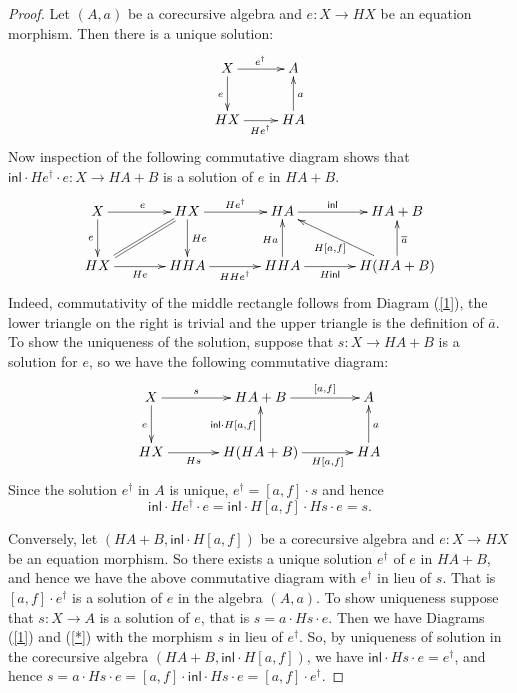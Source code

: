 \documentclass{LMCS}
\theoremstyle{plain}
\theoremstyle{definition}
\numberwithin{equation}{section}
\begin{document}
\begin{proof}
Let $(A, a)$ be a corecursive algebra and $e:X\rightarrow HX$ be an equation morphism. Then there is a unique solution:
\begin{equation}\label{1}
\vcenter{\xymatrix{
X\ar[r]^{e^\dagger}\ar[d]_{e}&A\\
HX\ar[r]_{He^\dagger}&HA\ar[u]_a
}}
\end{equation}
Now inspection of the following commutative diagram shows that $\mathsf{inl}\cdot He^\dagger\cdot e:X\rightarrow HA+B$ is a solution of $e$ in $HA+B$.
\begin{equation}\label{*}
\vcenter{\xymatrix@C+1pc{
X\ar[r]^e\ar[d]_-{e}&HX\ar[r]^-{He^\dagger}\ar[d]^-{He}&HA\ar[r]^-{\mathsf{inl}}&HA+B\\
HX\ar@{=}[ur]\ar[r]_-{He}&HHA\ar[r]_-{HHe^\dagger}&HHA\ar[u]^{Ha}\ar[r]_-{H\mathsf{inl}}&H(HA+B)\ar[lu]^{H[a,f]}\ar[u]_{\overline a}
}}
\end{equation}
Indeed, commutativity of the middle rectangle follows from Diagram (\ref{1}), the lower triangle on the right is trivial and the upper triangle is the definition of $\overline a$.
To show the uniqueness of the solution, suppose that $s:X\rightarrow HA+B$ is a solution for $e$, so we have the following commutative diagram:
$$
\xymatrix@C+1pc{
X\ar[r]^-{s}\ar[d]_e&HA+B\ar[r]^-{[a,f]}&A\\
HX\ar[r]_-{Hs}&H(HA+B)\ar[u]^{\mathsf{inl}\cdot H[a,f]}\ar[r]_-{H[a,f]}&HA\ar[u]_{a}
}
$$
Since the solution $e^\dagger$ in $A$ is unique, $e^\dagger=[a,f]\cdot s$ and hence
$$\mathsf{inl}\cdot He^\dagger \cdot e = \mathsf{inl}\cdot H[a,f]\cdot Hs\cdot e = s.$$

Conversely, let $(HA+B, \mathsf{inl}\cdot H[a,f])$ be a corecursive algebra and $e:X\rightarrow HX$ be an equation morphism. So there exists a unique solution $e^\dagger $ of $e$ in $HA+B$, and hence we have the above commutative diagram with $e^\dagger$ in lieu  of $s$. That is $[a,f]\cdot e^\dagger$ is a solution of $e$ in the algebra  $(A,a)$. To show uniqueness suppose that $s:X\rightarrow A$ is a solution of $e$, that is $s=a\cdot Hs\cdot e$. Then we have Diagrams (\ref{1}) and (\ref{*}) with the morphism $s$ in lieu of $e^\dagger$. So, by uniqueness of solution in the corecursive algebra $(HA+B, \mathsf{inl}\cdot H[a,f])$, we have   $\mathsf{inl}\cdot Hs\cdot e=e^\dagger$, and hence $s=a\cdot Hs\cdot e=[a,f]\cdot\mathsf{inl}\cdot Hs\cdot e=[a,f]\cdot e^\dagger$.
\end{proof}
\end{document}
